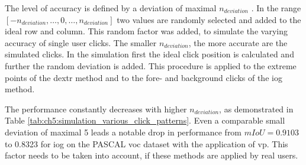 The level of accuracy is defined by a deviation of maximal $ n_{deviation} $ .
In the range $ \left[-n_{deviation}, \dots, 0, \dots, n_{deviation} \right] $ two values are randomly selected and added to the ideal row and column.
This random factor was added, to simulate the varying accuracy of single user clicks.
The smaller $ n_{deviation} $, the more accurate are the simulated clicks.
In the simulation first the ideal click position is calculated and further the random deviation is added.
This procedure is applied to the extreme points of the \gls{dextr} method and to the fore- and background clicks of the \gls{iog} method.
\begin{table}[h!]
	\centering	
	\caption[Simulations with different click patterns]{
		Simulations of the \gls{dextr} and \gls{iog} method with user clicks, that are simulated with varying degrees of accuracy.
		The parameter $ n_{deviation} $ states the maximal possible deviation from the optimal point, in order to mimic different types of users.
		As expected, the performance decreases with increasing deviation in the simulated user clicks.
	}\label{tab:ch5:simulation_various_click_patterns}
\end{table}

The performance constantly decreases with higher $ n_{deviation} $, as demonstrated in Table \ref{tab:ch5:simulation_various_click_patterns}. 
Even a comparable small deviation of maximal 5  leads a notable drop in performance \eg from $ mIoU = 0.9103 $ to 0.8323 for \gls{iog} on the PASCAL \gls{voc} dataset with the application of \gls{vp}.
This factor needs to be taken into account, if these methods are applied by real users.




